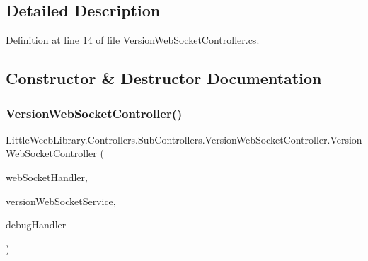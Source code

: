 \subsection{Detailed Description}


Definition at line 14 of file Version\+Web\+Socket\+Controller.\+cs.



\subsection{Constructor \& Destructor Documentation}
\mbox{\label{class_little_weeb_library_1_1_controllers_1_1_sub_controllers_1_1_version_web_socket_controller_a8c030dabf1c19d49efa902ef97a84f7a}} 
\subsubsection{\texorpdfstring{Version\+Web\+Socket\+Controller()}{VersionWebSocketController()}}
{\footnotesize\ttfamily Little\+Weeb\+Library.\+Controllers.\+Sub\+Controllers.\+Version\+Web\+Socket\+Controller.\+Version\+Web\+Socket\+Controller (\begin{DoxyParamCaption}\item[{\mbox{\hyperlink{interface_little_weeb_library_1_1_handlers_1_1_i_web_socket_handler}{I\+Web\+Socket\+Handler}}}]{web\+Socket\+Handler,  }\item[{\mbox{\hyperlink{interface_little_weeb_library_1_1_services_1_1_i_version_web_socket_service}{I\+Version\+Web\+Socket\+Service}}}]{version\+Web\+Socket\+Service,  }\item[{\mbox{\hyperlink{interface_little_weeb_library_1_1_handlers_1_1_i_debug_handler}{I\+Debug\+Handler}}}]{debug\+Handler }\end{DoxyParamCaption})}



